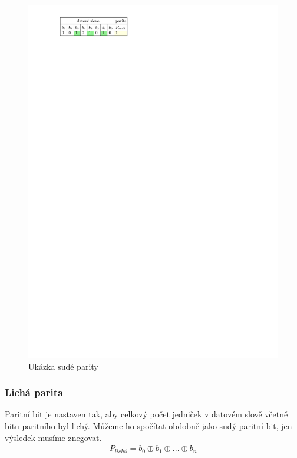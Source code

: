 \begin{figure}[H]
    \begin{center}
        \includegraphics[scale=1]{img/parita_suda}
    \end{center}
    \caption{Ukázka sudé parity}
\end{figure}

\subsubsection{Lichá parita}
Paritní bit je nastaven tak, aby celkový počet jedniček v datovém slově včetně bitu paritního byl lichý. Můžeme ho spočítat obdobně jako sudý paritní bit, jen výsledek musíme znegovat.
$$ P_{lichá} = \overline{ b_0 \oplus b_1 \oplus ... \oplus b_n } $$

